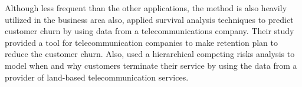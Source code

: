 \documentclass[12pt,letterpaper]{article}
\begin{document}
Although less frequent than the other applications, the method is also heavily utilized in the business area also, \citet{lu2002} applied survival analysis techniques to predict customer churn by using data from a telecommunications company. Their study provided a tool for telecommunication companies to make retention plan to reduce the customer churn.
Also, \citet{braun2011} used a hierarchical competing risks analysis to model when and why customers terminate their service by using the data from a provider of land-based telecommunication services. %
\end{document}
